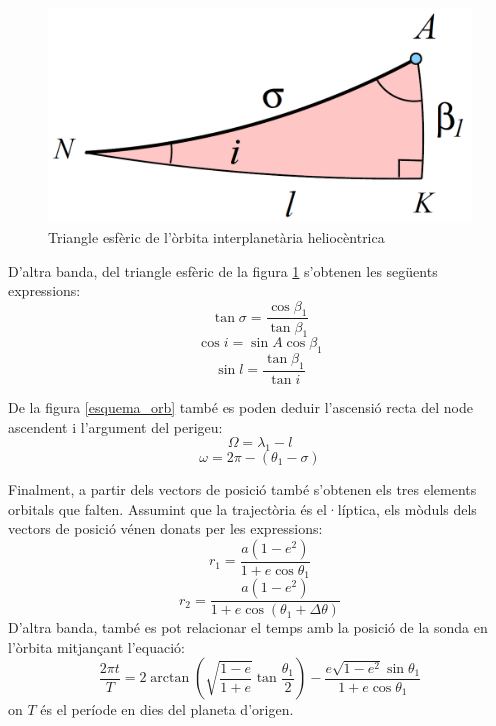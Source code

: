 \begin{figure}[H]
	\centering
	\includegraphics[scale=0.3]{./plots/triangle}
	\caption{Triangle esfèric de l'òrbita interplanetària heliocèntrica}
	\label{triang}
\end{figure}

D'altra banda, del triangle esfèric de la figura \ref{triang} s'obtenen les següents expressions:
\begin{equation}
\tan\sigma=\frac{\cos\beta_{1}}{\tan\beta_{1}}
\end{equation}
\begin{equation}
\cos i=\sin A\cos\beta_{1}
\label{eqi}
\end{equation}
\begin{equation}
\sin l=\frac{\tan\beta_{1}}{\tan i}
\end{equation}

De la figura \ref{esquema_orb} també es poden deduir l'ascensió recta del node ascendent i l'argument del perigeu:
\begin{equation}
\Omega=\lambda_{1}-l
\label{eqOmega}
\end{equation}
\begin{equation}
\omega=2\pi-\left(\theta_{1}-\sigma\right)
\label{eqw}
\end{equation}

Finalment, a partir dels vectors de posició també s'obtenen els tres elements orbitals que falten. Assumint que la trajectòria és el·líptica, els mòduls dels vectors de posició vénen donats per les expressions:
\begin{equation}
r_{1}=\frac{a\left(1-e^{2}\right)}{1+e\cos\theta_{1}}
\end{equation}
\begin{equation}
r_{2}=\frac{a\left(1-e^{2}\right)}{1+e\cos\left(\theta_{1}+\Delta\theta\right)}
\end{equation}
D'altra banda, també es pot relacionar el temps amb la posició de la sonda en l'òrbita mitjançant l'equació:
\begin{equation}
\frac{2\pi t}{T}=2\arctan\left(\sqrt{\frac{1-e}{1+e}}\tan\frac{\theta_{1}}{2}\right)-\frac{e\sqrt{1-e^{2}}\sin\theta_{1}}{1+e\cos\theta_{1}}
\end{equation}
on $T$ és el període en dies del planeta d'origen.

